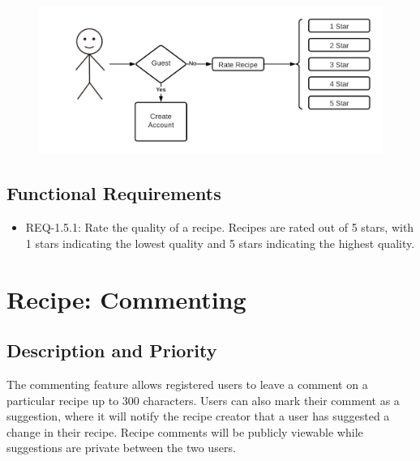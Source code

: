 \documentclass{scrreprt}
\begin{document}
\begin{figure}[H]\centering
    \includegraphics[width=\columnwidth]{FlowCharts/Recipe-Rating.png}
\end{figure}

\subsection{Functional Requirements}

\begin{itemize}
    \item REQ-1.5.1: Rate the quality of a recipe. Recipes are rated out of 5 stars, with 1 stars indicating the lowest quality and 5 stars indicating the highest quality.
\end{itemize}

\section{Recipe: Commenting}

\subsection{Description and Priority}

The commenting feature allows registered users to leave a comment on a particular recipe up to 300 characters. Users can also mark their comment as a suggestion, where it will notify the recipe creator that a user has suggested a change in their recipe. Recipe comments will be publicly viewable while suggestions are private between the two users.
\end{document}
